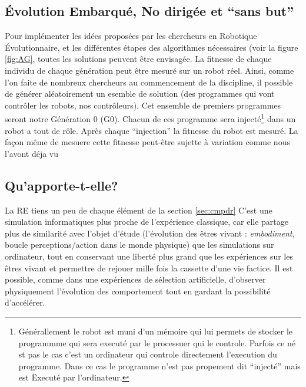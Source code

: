 \subsection{Évolution Embarqué, No dirigée et ``sans but''}
Pour implémenter les idées proposées par les chercheurs en Robotique Évolutionnaire, et les différentes étapes des algorithmes nécessaires (voir la figure \ref{fig:AG}, toutes les solutions peuvent être envisagée. La fitnesse de chaque individu de chaque génération peut être mesuré sur un robot réel. Ainsi, comme l'on faite de nombreux chercheurs au commencement de la discipline\citep{nolfi96learning,floreano94automaticcreationofanautonomousagen,jakobi97evolutionaryroboticsandtheradicalenvelopeofnoisehypothesis}, il possible de générer aléatoirement un esemble de solution (des programmes qui vont contrôler les robots, nos contrôleurs). Cet ensemble de premiers programmes seront notre Génération 0 (G0). Chacun de ces programme sera injecté\footnote{Générallement le robot est muni d'un mémoire qui lui permets de stocker le programmme qui sera executé par le processuer qui le controle. Parfois ce né st pas le cas c'est un ordinateur qui controle directement l'execution du programme. Dans ce cas le programme n'est pas propement dit ``injecté'' mais est Ëxecuté par l'ordinateur.} dans un robot a tout de rôle. Après chaque ``injection'' la fitnesse du robot est mesuré. La façon même de mesuere cette fitnesse peut-être sujette à variation comme nous l'avont déja vu


\subsection{Qu'apporte-t-elle?}
La RE tiens un peu de chaque élément de la section \ref{sec:cmpdr}
C'est une simulation informatiques plus proche de l'expérience classique, car elle partage plus de similarité avec l'objet d'étude (l'évolution des êtres vivant : \emph{embodiment}, boucle perceptions/action dans le monde physique) que les simulations sur ordinateur, tout en conservant une liberté plus grand que les expériences sur les êtres vivant et permettre de rejouer mille fois la cassette d'une vie factice. Il est possible, comme dans une expériences de sélection artificielle, d'observer physiquement l'évolution des comportement tout en gardant la possibilité d'accélérer.







